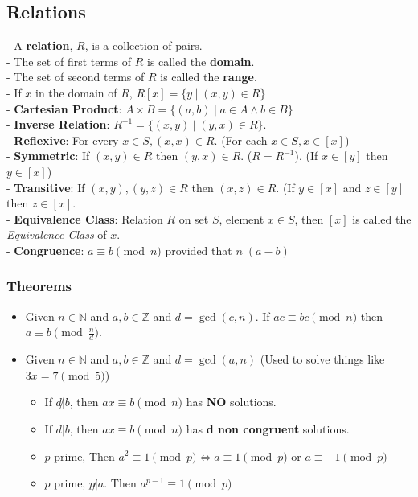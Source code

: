 \documentclass{article}
\newcommand\setbar{\hspace{3pt} \big| \hspace{3pt}}
\begin{document}
\begin{multicols}{3}
  \subsection*{Relations}
  - A \textbf{relation}, $R$, is a collection of pairs.\\
  - The set of first terms of $R$ is called the \textbf{domain}.\\
  - The set of second terms of $R$ is called the \textbf{range}.\\
  - If $x$ in the domain of $R$, $R[x] = \{y \setbar (x,y) \in R\}$\\
  - \textbf{Cartesian Product}: $A \times B = \{(a,b) \setbar a \in A \wedge b \in B\}$\\
  - \textbf{Inverse Relation}: $R^{-1} = \{(x,y) \setbar (y,x) \in R\}$.\\
  - \textbf{Reflexive}: For every $x \in S, (x,x) \in R$. (For each $x\in S, x \in [x]$)\\
  - \textbf{Symmetric}: If $(x,y) \in R$ then $(y,x) \in R$. ($R = R^{-1}$), (If $x \in [y]$ then $y \in [x]$)\\
  - \textbf{Transitive}: If $(x,y),(y,z) \in R$ then $(x,z) \in R$. (If $y \in [x]$ and $z \in [y]$ then $z \in [x]$.\\
  - \textbf{Equivalence Class}: Relation $R$ on set $S$, element $x \in S$, then $[x]$ is called the \textit{Equivalence Class} of $x$.\\
  - \textbf{Congruence}: $a \equiv b \pmod n$ provided that $n|(a - b)$\\
  \subsubsection*{Theorems}
  \begin{itemize}
  \item Given $n \in \mathbb N$ and $a,b \in \mathbb Z$ and $d = \gcd(c,n)$. If $ac \equiv bc \pmod{n}$ then $a \equiv b \pmod{\frac{n}{d}}$.
  \item Given $n \in \mathbb N$ and $a,b \in \mathbb Z$ and $d = \gcd(a,n)$ (Used to solve things like $3x = 7 \pmod 5$)
  \begin{itemize}
  \item If $d \not | b$, then $ax \equiv b \pmod{n}$ has \textbf{NO} solutions.
  \item If $d|b$, then $ax \equiv b \pmod{n}$ has \textbf{d non congruent} solutions.
  \item $p$ prime, Then $a^2 \equiv 1 \pmod p \iff a \equiv 1 \pmod p$ or
    $a \equiv -1 \pmod p$
  \item $p$ prime, $p \not | a$. Then $a^{p-1} \equiv 1 \pmod p$
  \end{itemize}
\end{itemize}

\end{multicols}
\end{document}
